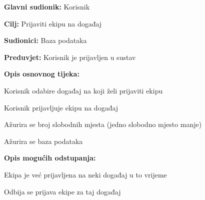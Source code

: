 				\noindent {}
				\begin{packed_item}
					
					\item \textbf{Glavni sudionik: }Korisnik
					\item  \textbf{Cilj:} Prijaviti ekipu na događaj
					\item  \textbf{Sudionici:} Baza podataka
					\item  \textbf{Preduvjet:} Korisnik je prijavljen u sustav
					\item  \textbf{Opis osnovnog tijeka:}
					
					\item[] \begin{packed_enum}
						
						\item Korisnik odabire događaj na koji želi prijaviti ekipu
						\item Korisnik prijavljuje ekipu na događaj
						\item Ažurira se broj slobodnih mjesta (jedno slobodno mjesto manje)
						\item Ažurira se baza podataka
					\end{packed_enum}

					\item  \textbf{Opis mogućih odstupanja:}
					
					\item[] \begin{packed_item}
						
						\item[20.a] Ekipa je već prijavljena na neki događaj u to vrijeme
						\item[] \begin{packed_enum}
							
							\item Odbija se prijava ekipe za taj događaj
							
						\end{packed_enum}

					\end{packed_item}
					
				\end{packed_item}



